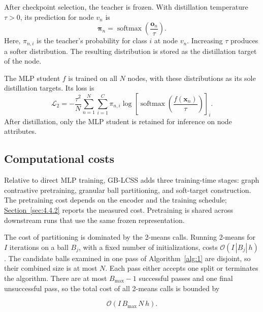 \documentclass[10pt,letterpaper,nopreprintline]{elsarticle}
\theoremstyle{definition}
\theoremstyle{plain}
\begin{document}
\Needspace{64pt}
After checkpoint selection, the teacher is frozen. With distillation temperature \(\tau>0\), its prediction for node \(v_n\) is
\begin{equation}\label{eq:20}
\boldsymbol\pi_n=\operatorname{softmax}\left(\frac{\mathbf o_n}{\tau}\right).
\end{equation}
Here, \(\pi_{n,i}\) is the teacher's probability for class \(i\) at node \(v_n\). Increasing \(\tau\) produces a softer distribution. The resulting distribution is stored as the distillation target of the node.

The MLP student \(f\) is trained on all \(N\) nodes, with these distributions as its sole distillation targets. Its loss is
\begin{equation}\label{eq:21}
\mathcal L_2=-\frac{\tau^2}{N}\sum_{n=1}^{N}\sum_{i=1}^C\pi_{n,i}
\log\left[\operatorname{softmax}\left(\frac{f(\mathbf x_n)}{\tau}\right)\right]_i.
\end{equation}
After distillation, only the MLP student is retained for inference on node attributes.

\subsection{Computational costs}\label{sec:3.6}

Relative to direct MLP training, GB-LCSS adds three training-time stages: graph contrastive pretraining, granular ball partitioning, and soft-target construction. The pretraining cost depends on the encoder and the training schedule; \hyperref[sec:4.4.2]{Section~\ref*{sec:4.4.2}} reports the measured cost. Pretraining is shared across downstream runs that use the same frozen representation.

\Needspace{64pt}

The cost of partitioning is dominated by the 2-means calls. Running 2-means for \(I\) iterations on a ball \(B_j\), with a fixed number of initializations, costs \(\mathcal{O}(I\,|B_j|\,h)\). The candidate balls examined in one pass of Algorithm~\ref{alg:1} are disjoint, so their combined size is at most \(N\). Each pass either accepts one split or terminates the algorithm. There are at most \(B_{\max}-1\) successful passes and one final unsuccessful pass, so the total cost of all 2-means calls is bounded by

\begin{equation}\label{eq:22}
\mathcal{O}(I\,B_{\max}\,N\,h).
\end{equation}
\end{document}

